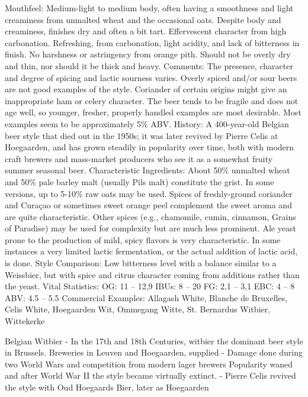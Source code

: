 \documentclass[a4paper,parskip=half]{scrartcl}
\begin{document}
Mouthfeel: Medium-light to medium body, often having a
smoothness and light creaminess from unmalted wheat and the
occasional oats. Despite body and creaminess, finishes dry and
often a bit tart. Effervescent character from high carbonation.
Refreshing, from carbonation, light acidity, and lack of
bitterness in finish. No harshness or astringency from orange
pith. Should not be overly dry and thin, nor should it be thick
and heavy.
Comments: The presence, character and degree of spicing
and lactic sourness varies. Overly spiced and/or sour beers are
not good examples of the style. Coriander of certain origins
might give an inappropriate ham or celery character. The beer
tends to be fragile and does not age well, so younger, fresher,
properly handled examples are most desirable. Most examples
seem to be approximately 5\% ABV.
History: A 400-year-old Belgian beer style that died out in the
1950s; it was later revived by Pierre Celis at Hoegaarden, and
has grown steadily in popularity over time, both with modern
craft brewers and mass-market producers who see it as a
somewhat fruity summer seasonal beer.
Characteristic Ingredients: About 50\% unmalted wheat
and 50\% pale barley malt (usually Pils malt) constitute the
grist. In some versions, up to 5-10\% raw oats may be used.
Spices of freshly-ground coriander and Curaçao or sometimes
sweet orange peel complement the sweet aroma and are quite
characteristic. Other spices (e.g., chamomile, cumin,
cinnamon, Grains of Paradise) may be used for complexity but
are much less prominent. Ale yeast prone to the production of
mild, spicy flavors is very characteristic. In some instances a
very limited lactic fermentation, or the actual addition of lactic
acid, is done.
Style Comparison: Low bitterness level with a balance
similar to a Weissbier, but with spice and citrus character
coming from additions rather than the yeast.
Vital Statistics:
OG: 11 – 12,9
IBUs: 8 – 20
FG: 2,1 – 3,1
EBC: 4 – 8
ABV: 4.5 – 5.5%
Commercial Examples: Allagash White, Blanche de
Bruxelles, Celis White, Hoegaarden Wit, Ommegang Witte,
St. Bernardus Witbier, Wittekerke
\parencite[48\psq]{BJCP2015}

Belgian Witbier
- In the 17th and 18th Centuries, witbier the dominant beer style in Brussels. Breweries in Leuven and Hoegaarden, supplied
- Damage done during two World Wars and competition from modern lager brewers Popularity waned and after World War II the style became virtually extinct.
- Pierre Celis revived the style with Oud Hoegaards Bier, later as Hoegaarden
\end{document}
